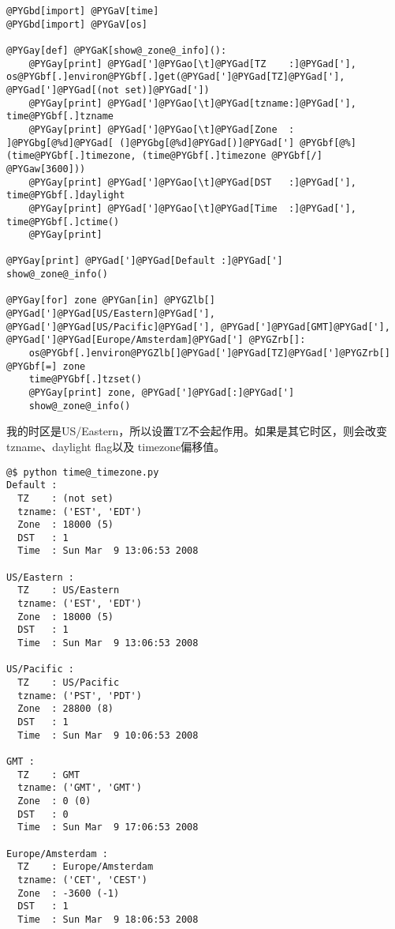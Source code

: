 \documentclass[letterpaper,10pt,english]{manual}
\begin{document}
\begin{Verbatim}[commandchars=@\[\]]
@PYGbd[import] @PYGaV[time]
@PYGbd[import] @PYGaV[os]

@PYGay[def] @PYGaK[show@_zone@_info]():
    @PYGay[print] @PYGad[']@PYGao[\t]@PYGad[TZ    :]@PYGad['], os@PYGbf[.]environ@PYGbf[.]get(@PYGad[']@PYGad[TZ]@PYGad['], @PYGad[']@PYGad[(not set)]@PYGad['])
    @PYGay[print] @PYGad[']@PYGao[\t]@PYGad[tzname:]@PYGad['], time@PYGbf[.]tzname
    @PYGay[print] @PYGad[']@PYGao[\t]@PYGad[Zone  : ]@PYGbg[@%d]@PYGad[ (]@PYGbg[@%d]@PYGad[)]@PYGad['] @PYGbf[@%] (time@PYGbf[.]timezone, (time@PYGbf[.]timezone @PYGbf[/] @PYGaw[3600]))
    @PYGay[print] @PYGad[']@PYGao[\t]@PYGad[DST   :]@PYGad['], time@PYGbf[.]daylight
    @PYGay[print] @PYGad[']@PYGao[\t]@PYGad[Time  :]@PYGad['], time@PYGbf[.]ctime()
    @PYGay[print]

@PYGay[print] @PYGad[']@PYGad[Default :]@PYGad[']
show@_zone@_info()

@PYGay[for] zone @PYGan[in] @PYGZlb[] @PYGad[']@PYGad[US/Eastern]@PYGad['], @PYGad[']@PYGad[US/Pacific]@PYGad['], @PYGad[']@PYGad[GMT]@PYGad['], @PYGad[']@PYGad[Europe/Amsterdam]@PYGad['] @PYGZrb[]:
    os@PYGbf[.]environ@PYGZlb[]@PYGad[']@PYGad[TZ]@PYGad[']@PYGZrb[] @PYGbf[=] zone
    time@PYGbf[.]tzset()
    @PYGay[print] zone, @PYGad[']@PYGad[:]@PYGad[']
    show@_zone@_info()
\end{Verbatim}

我的时区是US/Eastern，所以设置TZ不会起作用。如果是其它时区，则会改变tzname、daylight flag以及 timezone偏移值。

\begin{Verbatim}[commandchars=@\[\]]
@$ python time@_timezone.py
Default :
  TZ    : (not set)
  tzname: ('EST', 'EDT')
  Zone  : 18000 (5)
  DST   : 1
  Time  : Sun Mar  9 13:06:53 2008

US/Eastern :
  TZ    : US/Eastern
  tzname: ('EST', 'EDT')
  Zone  : 18000 (5)
  DST   : 1
  Time  : Sun Mar  9 13:06:53 2008

US/Pacific :
  TZ    : US/Pacific
  tzname: ('PST', 'PDT')
  Zone  : 28800 (8)
  DST   : 1
  Time  : Sun Mar  9 10:06:53 2008

GMT :
  TZ    : GMT
  tzname: ('GMT', 'GMT')
  Zone  : 0 (0)
  DST   : 0
  Time  : Sun Mar  9 17:06:53 2008

Europe/Amsterdam :
  TZ    : Europe/Amsterdam
  tzname: ('CET', 'CEST')
  Zone  : -3600 (-1)
  DST   : 1
  Time  : Sun Mar  9 18:06:53 2008
\end{Verbatim}
\end{document}
